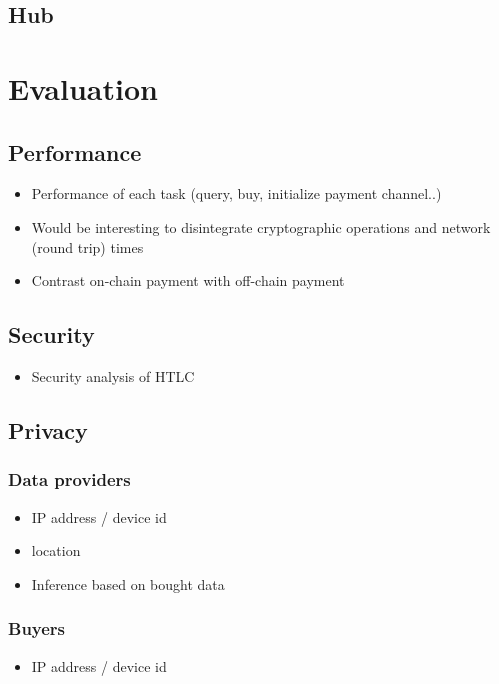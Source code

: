 \documentclass{sig-alternate}
\begin{document}
	\subsection{Hub}

\section{Evaluation}

	\subsection{Performance}
	\begin{itemize}
	\item Performance of each task (query, buy, initialize payment channel..)
	\item Would be interesting to disintegrate cryptographic operations and network (round trip) times
	\item Contrast on-chain payment with off-chain payment
	\end{itemize}


	\subsection{Security}
	\begin{itemize}
	\item Security analysis of HTLC
	\end{itemize}

	\subsection{Privacy}
		\subsubsection{Data providers}
		\begin{itemize}
		\item IP address / device id
		\item location
		\item Inference based on bought data
		\end{itemize}
		\subsubsection{Buyers}
		\begin{itemize}
		\item IP address / device id
		\end{itemize}
\end{document}
